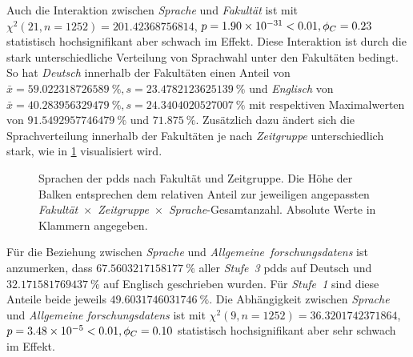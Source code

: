 Auch die Interaktion zwischen \textit{Sprache} und \textit{Fakultät} ist mit $\chi^2 (\num{21}, n=\num{1252}) = \num[round-mode=places,round-precision=2]{201.42368756814}$, $p = \num[round-mode=places,round-precision=2]{1.90053471088499E-31}<\num{0.01},\phi_C=\num[round-mode=places,round-precision=2]{0.231575430181447}$ statistisch hochsignifikant aber schwach im Effekt.
Diese Interaktion ist durch die stark unterschiedliche Verteilung von Sprachwahl unter den Fakultäten bedingt.
So hat \textit{Deutsch} innerhalb der Fakultäten einen Anteil von $\bar{x}=\SI[round-mode=places,round-precision=2]{59.022318726589}{\percent},s=\SI[round-mode=places,round-precision=2]{23.4782123625139}{\percent}$ und \textit{Englisch} von $\bar{x}=\SI[round-mode=places,round-precision=2]{40.283956329479}{\percent},s=\SI[round-mode=places,round-precision=2]{24.3404020527007}{\percent}$ mit respektiven Maximalwerten von $\SI[round-mode=places,round-precision=2]{91.5492957746479}{\percent}$ und $\SI[round-mode=places,round-precision=2]{71.875}{\percent}$.
Zusätzlich dazu ändert sich die Sprachverteilung innerhalb der Fakultäten je nach \textit{Zeitgruppe} unterschiedlich stark, wie in \cref{fig:luh-repo_sprache_x_fakultät_x_zeitgruppe} visualisiert wird.
\begin{figure}[!htbp]
    \resizebox{\ifdim\width>\textwidth\textwidth\else\width\fi}{!}{}
    \caption{Sprachen der \glspl{pdd} nach Fakultät und Zeitgruppe.
    Die Höhe der Balken entsprechen dem relativen Anteil zur jeweiligen angepassten \textit{Fakultät}~$\times$~\textit{Zeitgruppe}~$\times$~\textit{Sprache}-Gesamtanzahl.
    Absolute Werte in Klammern angegeben.}
    \label{fig:luh-repo_sprache_x_fakultät_x_zeitgruppe}
\end{figure}

Für die Beziehung zwischen \textit{Sprache} und \textit{Allgemeine~\glspl{forschungsdaten}} ist anzumerken, dass $\SI[round-mode=places,round-precision=2]{67.5603217158177}{\percent}$ aller \textit{Stufe~3} \glspl{pdd} auf Deutsch und $\SI[round-mode=places,round-precision=2]{32.171581769437}{\percent}$ auf Englisch geschrieben wurden.
Für \textit{Stufe~1} sind diese Anteile beide jeweils $\SI[round-mode=places,round-precision=2]{49.6031746031746}{\percent}$.
Die Abhängigkeit zwischen \textit{Sprache} und \textit{Allgemeine \glspl{forschungsdaten}} ist mit $\chi^2 (\num{9}, n=\num{1252}) = \num[round-mode=places,round-precision=2]{36.3201742371864}$, $p = \num[round-mode=places,round-precision=2]{3.47809061239522E-05}<\num{0.01},\phi_C=\num[round-mode=places,round-precision=2]{0.0983356900818459}$ statistisch hochsignifikant aber sehr schwach im Effekt.

